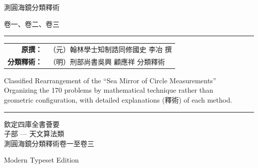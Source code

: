 \documentclass[11pt,a4paper]{article}
\newcommand{\shortline}{\noindent\rule{0.5\textwidth}{0.4pt}\par}
\newcounter{problem}[section]
\begin{document}
\thispagestyle{empty}
\begin{center}
\vspace*{2cm}
{\fontsize{36}{44}\selectfont
\textcolor{titlecolor}{測圓海鏡分類釋術}}

\vspace{1.5cm}
{\Large\textcolor{sectioncolor}{卷一、卷二、卷三}}

\vspace{2cm}
\shortline

\vspace{1cm}
{\large
\begin{tabular}{rl}
\textbf{原撰：} & （元）翰林學士知制誥同修國史 李冶 撰 \\
\textbf{分類釋術：} & （明）刑部尚書吳興 顧應祥 分類釋術 \\
\end{tabular}
}

\vspace{1.5cm}
{\normalsize\textcolor{notecolor}{%
Classified Rearrangement of the ``Sea Mirror of Circle Measurements''\\[0.3em]
Organizing the 170 problems by mathematical technique rather than\\[0.3em]
geometric configuration, with detailed explanations (釋術) of each method.
}}

\vspace{2cm}
\shortline

\vspace{0.8cm}
{\normalsize\textcolor{sectioncolor}{%
欽定四庫全書薈要\\[0.3em]
子部 --- 天文算法類\\[0.3em]
測圓海鏡分類釋術卷一至卷三
}}

\vspace{1cm}
{\small\textcolor{sectioncolor}{Modern Typeset Edition}}

\end{center}
\clearpage
\end{document}
